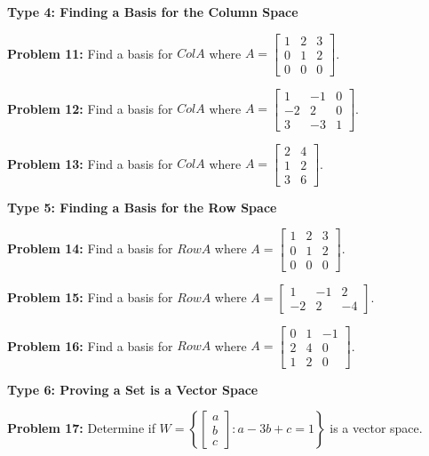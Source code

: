 \documentclass[11pt]{article}
\begin{document}
\vspace{0.5cm}
\noindent \textbf{Type 4: Finding a Basis for the Column Space}

\noindent \textbf{Problem 11:} Find a basis for $Col A$ where $A = \begin{bmatrix} 1 & 2 & 3 \\ 0 & 1 & 2 \\ 0 & 0 & 0 \end{bmatrix}$.

\noindent \textbf{Problem 12:} Find a basis for $Col A$ where $A = \begin{bmatrix} 1 & -1 & 0 \\ -2 & 2 & 0 \\ 3 & -3 & 1 \end{bmatrix}$.

\noindent \textbf{Problem 13:} Find a basis for $Col A$ where $A = \begin{bmatrix} 2 & 4 \\ 1 & 2 \\ 3 & 6 \end{bmatrix}$.

\vspace{0.5cm}
\noindent \textbf{Type 5: Finding a Basis for the Row Space}

\noindent \textbf{Problem 14:} Find a basis for $Row A$ where $A = \begin{bmatrix} 1 & 2 & 3 \\ 0 & 1 & 2 \\ 0 & 0 & 0 \end{bmatrix}$.

\noindent \textbf{Problem 15:} Find a basis for $Row A$ where $A = \begin{bmatrix} 1 & -1 & 2 \\ -2 & 2 & -4 \end{bmatrix}$.

\noindent \textbf{Problem 16:} Find a basis for $Row A$ where $A = \begin{bmatrix} 0 & 1 & -1 \\ 2 & 4 & 0 \\ 1 & 2 & 0 \end{bmatrix}$.

\vspace{0.5cm}
\noindent \textbf{Type 6: Proving a Set is a Vector Space}

\noindent \textbf{Problem 17:} Determine if $W = \left\{ \begin{bmatrix} a \\ b \\ c \end{bmatrix} : a - 3b + c = 1 \right\}$ is a vector space.
\end{document}
